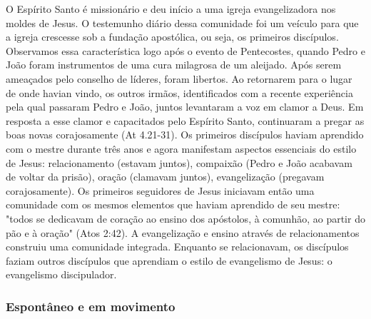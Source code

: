 \documentclass[
	12pt,				%
	openright,			%
	twoside,			%
	a4paper,			%
	english,			%
	french,				%
	spanish,			%
	brazil				%
	]{abntex2}
\begin{document}
O Espírito Santo é missionário e deu início a uma igreja evangelizadora nos moldes de Jesus. O testemunho diário dessa comunidade foi um veículo para que a igreja crescesse \cite[78]{stott} sob a fundação apostólica, ou seja, os primeiros discípulos. Observamos essa característica logo após o evento de Pentecostes, quando Pedro e João foram instrumentos de uma cura milagrosa de um aleijado. Após serem ameaçados pelo conselho de líderes, foram libertos. Ao retornarem para o lugar de onde havian vindo, os outros irmãos, identificados com a recente experiência pela qual passaram Pedro e João, juntos levantaram a voz em clamor a Deus. Em resposta a esse clamor e capacitados pelo Espírito Santo, continuaram a pregar as boas novas corajosamente (At 4.21-31). Os primeiros discípulos haviam aprendido com o mestre durante três anos e agora manifestam aspectos essenciais do estilo de Jesus: relacionamento (estavam juntos), compaixão (Pedro e João acabavam de voltar da prisão), oração (clamavam juntos), evangelização (pregavam corajosamente). Os primeiros seguidores de Jesus iniciavam então uma comunidade com os mesmos elementos que haviam aprendido de seu mestre: "todos se dedicavam de coração ao ensino dos apóstolos, à comunhão, ao partir do pão e à oração" (Atos 2:42). A evangelização e ensino através de relacionamentos construiu uma comunidade integrada. Enquanto se relacionavam, os discípulos faziam outros discípulos que aprendiam o estilo de evangelismo de Jesus: o evangelismo discipulador.



\subsubsection{Espontâneo e em movimento}
\end{document}
